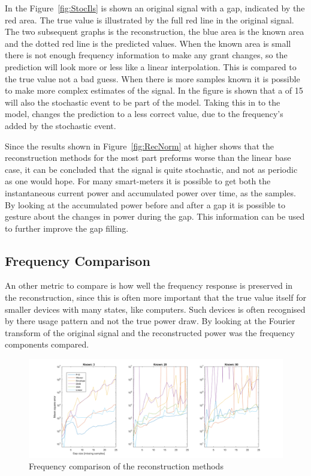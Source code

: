 In the Figure~\ref{fig:StocIls} is shown an original signal with a gap, indicated by the red area. The true value is illustrated by the full red line in the original signal. The two subsequent graphs is the reconstruction, the blue area is the known area and the dotted red line is the predicted values. When the known area is small there is not enough frequency information to make any grant changes, so the prediction will look more or less like a linear interpolation. This is compared to the true value not a bad guess. When there is more samples known it is possible to make more complex estimates of the signal. In the figure is shown that a  of 15 will also the stochastic event to be part of the model. Taking this in to the model, changes the prediction to a less correct value, due to the frequency's added by the stochastic event. 

Since the results shown in Figure~\ref{fig:RecNorm} at higher  shows that the reconstruction methods for the most part preforms worse than the linear base case, it can be concluded that the signal is quite stochastic, and not as periodic as one would hope. For many smart-meters it is possible to get both the instantaneous current power and accumulated power over time, as the samples. By looking at the accumulated power before and after a gap it is possible to gesture about the changes in power during the gap. This information can be used to further improve the gap filling. 

\newpage

\subsection{Frequency Comparison}
An other metric to compare is how well the frequency response is preserved in the reconstruction, since this is often more important that the true value itself for smaller devices with many states, like computers. Such devices is often recognised by there usage pattern and not the true power draw. By looking at the Fourier transform of the original signal and the reconstructed power was the frequency components compared. 

\begin{figure}[H]
\centering
\includegraphics[width=1\textwidth]{billeder/RecFeq.png}
\caption{Frequency comparison of the reconstruction methods}
\label{fig:RecFeq}
\end{figure}


